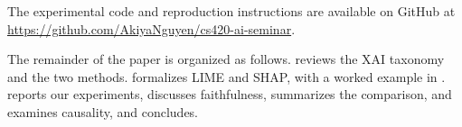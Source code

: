 \noindent The experimental code and reproduction instructions are available on GitHub at \url{https://github.com/AkiyaNguyen/cs420-ai-seminar}.

The remainder of the paper is organized as follows.  reviews the XAI taxonomy and the two methods.  formalizes LIME and SHAP, with a worked example in .  reports our experiments,  discusses faithfulness, summarizes the comparison, and examines causality, and  concludes.
